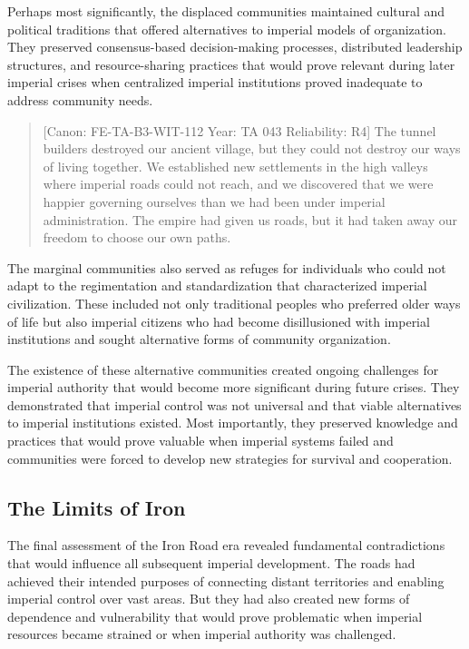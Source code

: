 Perhaps most significantly, the displaced communities maintained
cultural and political traditions that offered alternatives to imperial
models of organization. They preserved consensus-based decision-making
processes, distributed leadership structures, and resource-sharing
practices that would prove relevant during later imperial crises when
centralized imperial institutions proved inadequate to address community
needs.

\begin{quote}
{[}Canon: FE-TA-B3-WIT-112 \textbar{} Year: TA 043 \textbar{}
Reliability: R4{]} The tunnel builders destroyed our ancient village,
but they could not destroy our ways of living together. We established
new settlements in the high valleys where imperial roads could not
reach, and we discovered that we were happier governing ourselves than
we had been under imperial administration. The empire had given us
roads, but it had taken away our freedom to choose our own paths.
\end{quote}

The marginal communities also served as refuges for individuals who
could not adapt to the regimentation and standardization that
characterized imperial civilization. These included not only traditional
peoples who preferred older ways of life but also imperial citizens who
had become disillusioned with imperial institutions and sought
alternative forms of community organization.

The existence of these alternative communities created ongoing
challenges for imperial authority that would become more significant
during future crises. They demonstrated that imperial control was not
universal and that viable alternatives to imperial institutions existed.
Most importantly, they preserved knowledge and practices that would
prove valuable when imperial systems failed and communities were forced
to develop new strategies for survival and cooperation.

\subsection{The Limits of Iron}\label{the-limits-of-iron-1}

The final assessment of the Iron Road era revealed fundamental
contradictions that would influence all subsequent imperial development.
The roads had achieved their intended purposes of connecting distant
territories and enabling imperial control over vast areas. But they had
also created new forms of dependence and vulnerability that would prove
problematic when imperial resources became strained or when imperial
authority was challenged.

